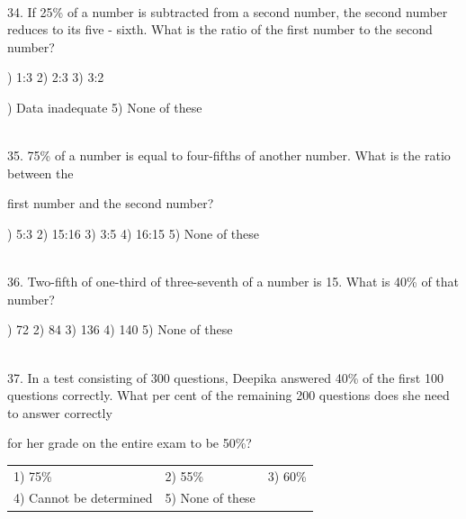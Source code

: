 \documentclass{article}
\begin{document}
\noindent 

\noindent 

\noindent 

\noindent \\ 34. If 25\% of a number is subtracted from a second number, the second number reduces to its five - sixth. What is the ratio of the first number to the second number?

) 1:3                                                              2) 2:3                                           3) 3:2

\noindent 

) Data inadequate                                      5) None of these

\noindent 

\noindent 

\noindent \\  35. 75\% of a number is equal to four-fifths of another number. What is the ratio between the

\noindent 

\noindent first number and the second number?

\noindent 

) 5:3                       2) 15:16            3) 3:5                4) 16:15            5) None of these

\noindent 

\noindent 

\noindent 

\noindent \\ 36. Two-fifth of one-third of three-seventh of a number is 15. What is 40\% of that number?

\noindent 

) 72                        2) 84                 3) 136               4) 140               5) None of these

\noindent 

\noindent 

\noindent 

\noindent \\ 37. In a test consisting of 300 questions, Deepika answered 40\% of the first 100 questions correctly. What per cent of the remaining 200 questions does she need to answer correctly

\noindent for her grade on the entire exam to be 50\%?

\noindent 

\begin{tabular}{p{2.0in} p{1.4in} p{0.6in}|}  
1) 75\% & 2) 55\% & 3) 60\% \\ 
4) Cannot be determined & 5) None of these &  \\ 
\end{tabular}
\end{document}
